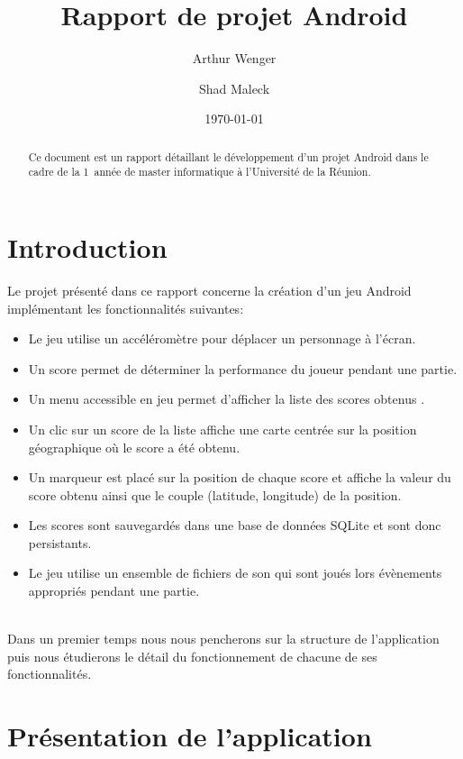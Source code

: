 \documentclass{article}
\title{Rapport de projet Android}
\author{Arthur Wenger \and Shad Maleck}
\date{\today}
\begin{document}
\maketitle


\begin{abstract}
  Ce document est un rapport détaillant le développement d'un projet Android dans le cadre de la 1\iere\ année de master informatique à l'Université de la Réunion.
\end{abstract}


\section{Introduction}
Le projet présenté dans ce rapport concerne la création d'un jeu Android implémentant les fonctionnalités suivantes:\\
\begin{itemize}
  \item Le jeu utilise un accéléromètre pour déplacer un personnage à l'écran.
  \item Un score permet de déterminer la performance du joueur pendant une partie. 
  \item Un menu accessible en jeu permet d’afficher la liste des scores obtenus .
  \item Un clic sur un score de la liste affiche une carte centrée sur la position
  géographique où le score a été obtenu.
  \item Un marqueur est placé sur la position de chaque score et affiche la valeur du score obtenu ainsi que le couple (latitude, longitude) de la position.
  \item Les scores sont sauvegardés dans une base de données SQLite et sont donc persistants.
  \item Le jeu utilise un ensemble de fichiers de son qui sont joués lors évènements appropriés pendant une partie.
\end{itemize}~\\
Dans un premier temps nous nous pencherons sur la structure de l'application puis nous étudierons le détail du fonctionnement de chacune de ses fonctionnalités.

\section{Présentation de l'application}
\end{document}
